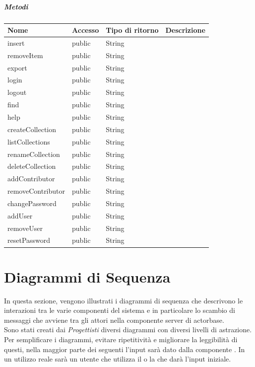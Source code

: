 \documentclass{scalatekids-article}
\begin{document}
\subparagraph{Metodi}

\begin{tabular}{| l | l | l | l |}
  \hline
  Nome & Accesso & Tipo di ritorno & Descrizione\\
  \hline
  insert & public & String & \\
  \hline
  removeItem & public & String & \\
  \hline
  export & public & String & \\
  \hline
  login & public & String & \\
  \hline
  logout & public & String & \\
  \hline
  find & public & String & \\
  \hline
  help & public & String & \\
  \hline
  createCollection & public & String & \\
  \hline
  listCollections & public & String & \\
  \hline
  renameCollection & public & String & \\
  \hline
  deleteCollection & public & String & \\
  \hline
  addContributor & public & String & \\
  \hline
  removeContributor & public & String & \\
  \hline
  changePassword & public & String & \\
  \hline
  addUser & public & String & \\
  \hline
  removeUser & public & String & \\
  \hline
  resetPassword & public & String & \\
  \hline
\end{tabular}

\section{Diagrammi di Sequenza}

In questa sezione, vengono illustrati i diagrammi di sequenza che descrivono
le interazioni tra le varie componenti del sistema e in particolare lo scambio
di messaggi che avviene tra gli attori nella componente server di actorbase.\\
Sono stati creati dai \textit{Progettisti} diversi diagrammi con diversi livelli
di astrazione.\\
Per semplificare i diagrammi, evitare ripetitività e migliorare la leggibilità di
questi, nella maggior parte dei seguenti l'input sarà dato dalla componente . In un utilizzo reale sarà un utente che utilizza il  o la
 che darà l'input iniziale.
\end{document}
